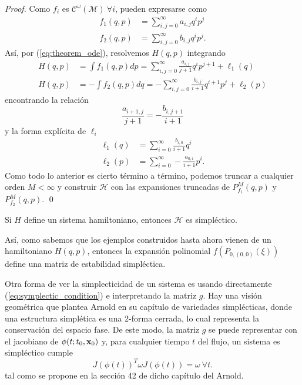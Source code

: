 \begin{proof}
Como $f_i$ es $\mathcal{C}^\omega(\mathcal{M}) \ \forall i$, pueden expresarse como
\begin{align*}
 f_1(q,p) &= \sum_{i,j = 0}^\infty a_{i,j} q^i p^j \\
 f_2(q,p) &= \sum_{i,j = 0}^\infty b_{i,j} q^i p^j. 
\end{align*}
Así, por (\ref{eq:theorem_ode}), resolvemos $H(q,p)$ integrando
\begin{align*}
 H(q,p) &= \int f_1(q,p) dp = \sum_{i,j = 0}^\infty \frac{a_{i,j}}{j+1} q^i p^{j+1} + \ell_1(q) \\
 H(q,p) &= -\int f_2(q,p) dq = -\sum_{i,j = 0}^\infty \frac{b_{i,j}}{i+1} q^{i+1} p^j + \ell_2(p)
\end{align*}
encontrando la relación 
\begin{equation*}
 \frac{a_{i+1,j}}{j+1} = - \frac{b_{i,j+1}}{i+1} 
\end{equation*}
y la forma explícita de $\ell_i$
\begin{align*}
 \ell_1(q) &= \sum_{i=0}^\infty \frac{b_{i,0}}{i+1} q^i \\
 \ell_2(p) &= \sum_{i=0}^\infty -\frac{a_{0,i}}{i+1} p^i.
\end{align*}
Como todo lo anterior es cierto término a término, podemos truncar a cualquier orden $M < \infty$ y construir $\mathcal{H}$ con las expansiones truncadas de $P_{f_1}^M(q,p)$ y $P_{f_2}^M(q,p)$. \qed
\end{proof}

\begin{corolario}
Si $H$ define un sistema hamiltoniano, entonces $\mathcal{H}$ es simpléctico. 
\end{corolario}

Así, como sabemos que los ejemplos construidos hasta ahora vienen de un hamiltoniano $H(q,p)$, entonces la expansión polinomial $f(P_{0,(0,0)}(\xi))$ define una matriz de estabilidad simpléctica. 

Otra forma de ver la simplecticidad de un sistema es usando directamente (\ref{eq:symplectic_condition}) e interpretando la matriz $g$. Hay una visión geométrica que plantea Arnold \cite{Arnold1989} en su capítulo de variedades simplécticas, donde una estructura simplética es una 2-forma cerrada, lo cual representa la conservación del espacio fase. De este modo, la matriz $g$ se puede representar con el jacobiano de $\phi(t;t_0,\mathbf{x}_0)$ y, para cualquier tiempo $t$ del flujo, un sistema es simpléctico cumple
\begin{equation}
 J(\phi(t))^T \omega J(\phi(t)) = \omega \ \forall t.
 \label{eq:sympletic_flow}
\end{equation} 
tal como se propone en la sección 42 de dicho capítulo del Arnold.

